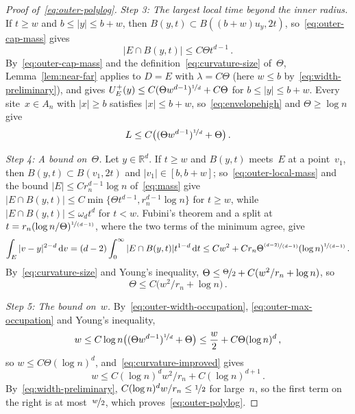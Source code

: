 \documentclass[11pt]{amsart}
\theoremstyle{plain}
\theoremstyle{definition}
\newcommand{\R}{\mathbb R}
\newcommand{\dd}{\,\mathrm d}
\newcommand{\nf}{\nicefrac}
\numberwithin{equation}{section}
\begin{document}
\begin{proof}[Proof of~\eqref{eq:outer-polylog}]
\emph{Step 3: The largest local time beyond the inner radius.} If $t\geq w$ and $b\leq|y|\leq b+w$, then $B(y,t)\subset B((b+w)u_y,2t)$, so~\eqref{eq:outer-cap-mass} gives
\begin{equation}\label{eq:outer-local-mass}
|E\cap B(y,t)|\leq C\Theta t^{d-1}\, .
\end{equation}
By~\eqref{eq:outer-cap-mass} and the definition~\eqref{eq:curvature-size} of~$\Theta$, Lemma~\ref{lem:near-far} applies to $D=E$ with $\lambda=C\Theta$ (here $w\leq b$ by~\eqref{eq:width-preliminary}), and gives $U_E^+(y)\leq C(\Theta w^{d-1})^{\nf1d}+C\Theta$ for $b\leq|y|\leq b+w$. Every site~$x\in A_n$ with $|x|\geq b$ satisfies $|x|\leq b+w$, so~\eqref{eq:envelopehigh} and $\Theta\geq\log n$ give
\begin{equation}\label{eq:outer-max-occupation}
L\leq C\bigl((\Theta w^{d-1})^{\nf1d}+\Theta\bigr)\, .
\end{equation}

\emph{Step 4: A bound on~$\Theta$.} Let $y\in\R^d$. If $t\geq w$ and $B(y,t)$ meets~$E$ at a point~$v_1$, then $B(y,t)\subset B(v_1,2t)$ and $|v_1|\in[b,b+w]$; so~\eqref{eq:outer-local-mass} and the bound $|E|\leq Cr_n^{d-1}\log n$ of~\eqref{eq:mass} give $|E\cap B(y,t)|\leq C\min\{\Theta t^{d-1},r_n^{d-1}\log n\}$ for $t\geq w$, while $|E\cap B(y,t)|\leq\omega_dt^d$ for $t<w$. Fubini's theorem and a split at $t=r_n(\log n/\Theta)^{\nf{1}{(d-1)}}$, where the two terms of the minimum agree, give
\begin{equation*}
\int_E|v-y|^{2-d}\dd v=(d-2)\int_0^\infty|E\cap B(y,t)|t^{1-d}\dd t\leq Cw^2+Cr_n\Theta^{\nf{(d-2)}{(d-1)}}(\log n)^{\nf{1}{(d-1)}}\, .
\end{equation*}
By~\eqref{eq:curvature-size} and Young's inequality, $\Theta\leq\nf\Theta2+C(w^2/r_n+\log n)$, so
\begin{equation}\label{eq:curvature-improved}
\Theta\leq C\bigl(w^2/r_n+\log n\bigr)\, .
\end{equation}

\emph{Step 5: The bound on~$w$.} By~\eqref{eq:outer-width-occupation}, \eqref{eq:outer-max-occupation} and Young's inequality,
\begin{equation*}
w\leq C\log n\bigl((\Theta w^{d-1})^{\nf1d}+\Theta\bigr)\leq\frac w2+C\Theta(\log n)^d\, ,
\end{equation*}
so $w\leq C\Theta(\log n)^d$, and~\eqref{eq:curvature-improved} gives
\begin{equation*}
w\leq C(\log n)^dw^2/r_n+C(\log n)^{d+1}\, .
\end{equation*}
By~\eqref{eq:width-preliminary}, $C(\log n)^dw/r_n\leq\nf12$ for large~$n$, so the first term on the right is at most~$\nf{w}{2}$, which proves~\eqref{eq:outer-polylog}.
\end{proof}
\end{document}
